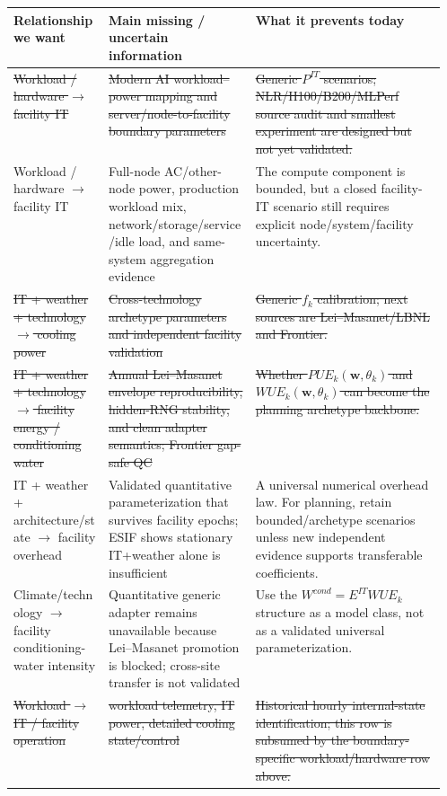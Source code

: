 \documentclass[11pt]{article}
\newcommand{\oldtxt}[1]{\textcolor{blue!70!black}{\sout{#1}}}
\newcommand{\latesttxt}[1]{\textcolor{purple!85!black}{#1}}
\begin{document}
\begin{center}
\scriptsize
\begin{tabularx}{\linewidth}{@{}p{0.22\linewidth}p{0.34\linewidth}Y@{}}
\toprule
\textbf{Relationship we want} & \textbf{Main missing / uncertain information} & \textbf{What it prevents today} \\
\midrule
\oldtxt{Workload / hardware \(\rightarrow\) facility IT} & \oldtxt{Modern AI workload--power mapping and server/node-to-facility boundary parameters} & \oldtxt{Generic \(P^{IT}\) scenarios; NLR/H100/B200/MLPerf source audit and smallest experiment are designed but not yet validated.} \\
\latesttxt{Workload / hardware \(\rightarrow\) facility IT} & \latesttxt{Full-node AC/other-node power, production workload mix, network/storage/service/idle load, and same-system aggregation evidence} & \latesttxt{The compute component is bounded, but a closed facility-IT scenario still requires explicit node/system/facility uncertainty.} \\
\oldtxt{IT + weather + technology \(\rightarrow\) cooling power} & \oldtxt{Cross-technology archetype parameters and independent facility validation} & \oldtxt{Generic \(f_k\) calibration; next sources are Lei--Masanet/LBNL and Frontier.} \\
\oldtxt{IT + weather + technology \(\rightarrow\) facility energy / conditioning water} & \oldtxt{Annual Lei--Masanet envelope reproducibility, hidden-RNG stability, and clean adapter semantics; Frontier gap-safe QC} & \oldtxt{Whether \(PUE_k(\mathbf w,\theta_k)\) and \(WUE_k(\mathbf w,\theta_k)\) can become the planning archetype backbone.} \\
\latesttxt{IT + weather + architecture/state \(\rightarrow\) facility overhead} & \latesttxt{Validated quantitative parameterization that survives facility epochs; ESIF shows stationary IT+weather alone is insufficient} & \latesttxt{A universal numerical overhead law. For planning, retain bounded/archetype scenarios unless new independent evidence supports transferable coefficients.} \\
\latesttxt{Climate/technology \(\rightarrow\) facility conditioning-water intensity} & \latesttxt{Quantitative generic adapter remains unavailable because Lei--Masanet promotion is blocked; cross-site transfer is not validated} & \latesttxt{Use the \(W^{cond}=E^{IT}WUE_k\) structure as a model class, not as a validated universal parameterization.} \\
\oldtxt{Workload \(\rightarrow\) IT / facility operation} & \oldtxt{workload telemetry, IT power, detailed cooling state/control} & \oldtxt{Historical hourly internal-state identification; this row is subsumed by the boundary-specific workload/hardware row above.} \\

\end{tabularx}
\end{center}
\end{document}
